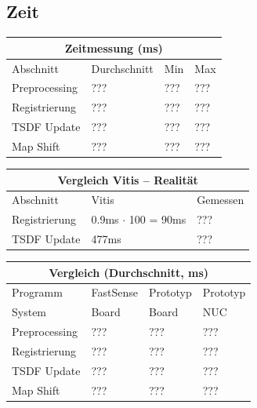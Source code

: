 \documentclass{beamer}
\begin{document}
\subsection{Zeit}
\begin{frame}{\subsecname}
\centering
\begin{tabular}{ |p{3cm}||p{2cm}|p{2cm}|p{2cm}|  }
 \hline
 \multicolumn{4}{|c|}{Zeitmessung (ms)} \\
 \hline
 Abschnitt      & Durchschnitt & Min & Max\\
 \hline
 Preprocessing  &          ??? & ??? & ??? \\
 Registrierung  &          ??? & ??? & ??? \\
 TSDF Update    &          ??? & ??? & ??? \\
 Map Shift      &          ??? & ??? & ??? \\
 \hline
\end{tabular}
\end{frame}

\begin{frame}{\subsecname}
\centering
\begin{tabular}{ |l||l|l|  }
 \hline
 \multicolumn{3}{|c|}{Vergleich Vitis -- Realität} \\
 \hline
 Abschnitt      & Vitis & Gemessen\\
 \hline
 Registrierung  & 0.9ms $\cdot$ 100 = 90ms & ??? \\
 TSDF Update    & 477ms & ??? \\
 \hline
\end{tabular}
\end{frame}

\begin{frame}{\subsecname}
\centering
\begin{tabular}{ |p{3cm}||p{2cm}|p{2cm}|p{2cm}|  }
 \hline
 \multicolumn{4}{|c|}{Vergleich (Durchschnitt, ms)} \\
 \hline
 Programm       & FastSense & Prototyp & Prototyp \\
 \hline
 System         &     Board &    Board &      NUC \\
 \hline
 Preprocessing  &       ??? &      ??? &      ??? \\
 Registrierung  &       ??? &      ??? &      ??? \\
 TSDF Update    &       ??? &      ??? &      ??? \\
 Map Shift      &       ??? &      ??? &      ??? \\
\hline
\end{tabular}
\end{frame}
\end{document}
